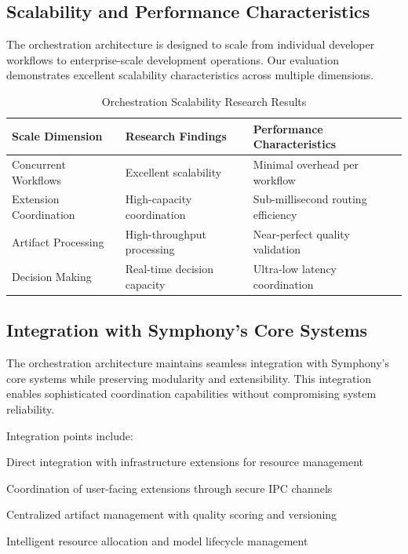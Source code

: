\subsection*{Scalability and Performance Characteristics}

The orchestration architecture is designed to scale from individual developer workflows to enterprise-scale development operations. Our evaluation demonstrates excellent scalability characteristics across multiple dimensions.

\begin{table}[ht]
\centering
\begin{tabular}{@{}lll@{}}
\toprule
\textbf{Scale Dimension} & \textbf{Research Findings} & \textbf{Performance Characteristics} \\
\midrule
Concurrent Workflows & Excellent scalability & Minimal overhead per workflow \\
Extension Coordination & High-capacity coordination & Sub-millisecond routing efficiency \\
Artifact Processing & High-throughput processing & Near-perfect quality validation \\
Decision Making & Real-time decision capacity & Ultra-low latency coordination \\
\bottomrule
\end{tabular}
\caption{Orchestration Scalability Research Results}
\end{table}

\subsection*{Integration with Symphony's Core Systems}

The orchestration architecture maintains seamless integration with Symphony's core systems while preserving modularity and extensibility. This integration enables sophisticated coordination capabilities without compromising system reliability.

Integration points include:

\begin{description}[leftmargin=3cm,labelwidth=2.5cm]
    \item[\textbf{The Pit}] Direct integration with infrastructure extensions for resource management
    \item[\textbf{Grand Stage}] Coordination of user-facing extensions through secure IPC channels
    \item[\textbf{Artifact Store}] Centralized artifact management with quality scoring and versioning
    \item[\textbf{Pool Manager}] Intelligent resource allocation and model lifecycle management
\end{description}

